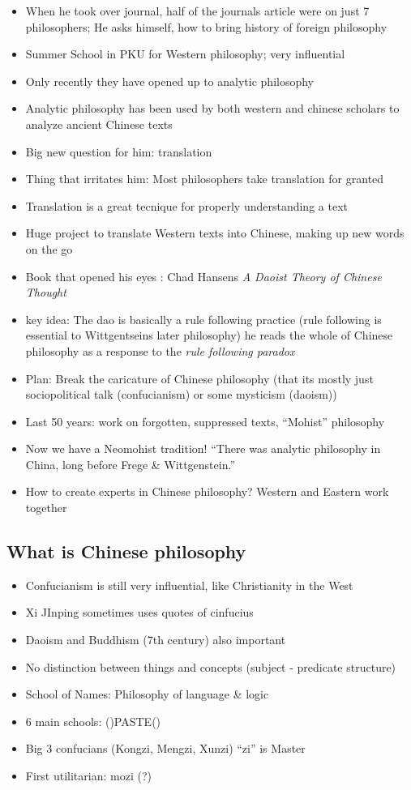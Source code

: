 \documentclass[emulatestandardclasses]{scrartcl}
\begin{document}
\begin{itemize}
  \item When he took over journal, half of the journals article were on just 7 philosophers; He asks himself, how to bring history of foreign philosophy
  \item Summer School in PKU for Western philosophy; very influential
  \item Only recently they have opened up to analytic philosophy
  \item Analytic philosophy has been used by both western and chinese scholars to analyze ancient Chinese texts
  \item Big new question for him: translation
  \item Thing that irritates him: Most philosophers take translation for granted
  \item Translation is a great tecnique for properly understanding a text
  \item Huge project to translate Western texts into Chinese, making up new words on the go
  \item Book that opened his eyes : Chad Hansens  \emph{A Daoist Theory of Chinese Thought}
  \item key idea: The dao is basically a rule following practice (rule following is essential to Wittgentseins later philosophy) he reads the whole of Chinese philosophy as a response to the \emph{rule following paradox}
  \item Plan: Break the caricature of Chinese philosophy (that its mostly just sociopolitical talk (confucianism) or some mysticism (daoism))
  \item Last 50 years: work on forgotten, suppressed texts, "`Mohist"' philosophy
  \item Now we have a Neomohist tradition! "`There was analytic philosophy in China, long before Frege \& Wittgenstein."'
  \item How to create experts in Chinese philosophy? Western and Eastern work together
\end{itemize}


\subsection{What is Chinese philosophy}

\begin{itemize}
  \item Confucianism is still very influential, like Christianity in the West
  \item Xi JInping sometimes uses quotes of cinfucius
  \item Daoism and Buddhism (7th century) also important
  \item No distinction between things and concepts (subject - predicate structure)
  \item School of Names: Philosophy of language \& logic
  \item 6 main schools: ()PASTE()
  \item Big 3 confucians (Kongzi, Mengzi, Xunzi) "`zi"' is Master
  \item First utilitarian: mozi (?)
\end{itemize}
\end{document}
